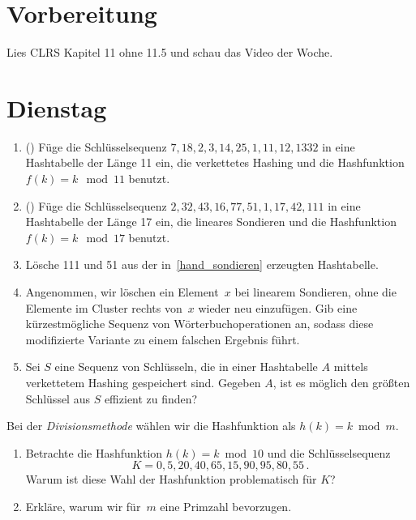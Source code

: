 \documentclass{uebung_cs}
\begin{document}
\section*{Vorbereitung}
Lies CLRS Kapitel 11 ohne 11.5 und schau das Video der Woche.

\section*{Dienstag}
\begin{aufgabe}\label{tue-first}\mbox{}
	\begin{enumerate}
		\item (\warmup) Füge die Schlüsselsequenz $7, 18, 2, 3, 14, 25, 1, 11, 12, 1332$ in eine Hashtabelle der Länge 11 ein, die verkettetes Hashing und die Hashfunktion $f(k) = k \mod 11$ benutzt.
		\item\label{hand_sondieren} (\warmup) Füge die Schlüsselsequenz $2, 32, 43, 16, 77, 51, 1, 17, 42, 111$ in eine Hashtabelle der Länge 17 ein, die lineares Sondieren und die Hashfunktion $f(k) = k \mod 17$ benutzt.
		\item Lösche 111 und 51 aus der in~\ref{hand_sondieren} erzeugten Hashtabelle.
		\item\label{wrong_delete} Angenommen, wir löschen ein Element~$x$ bei linearem Sondieren, ohne die Elemente im Cluster rechts von~$x$ wieder neu einzufügen.
		Gib eine kürzestmögliche Sequenz von Wörterbuchoperationen an, sodass diese modifizierte Variante zu einem falschen Ergebnis führt.
		\item Sei $S$ eine Sequenz von Schlüsseln, die in einer Hashtabelle $A$ mittels verkettetem Hashing gespeichert sind.
		Gegeben $A$, ist es möglich den größten Schlüssel aus $S$ effizient zu finden?
	\end{enumerate}
\end{aufgabe}

\begin{aufgabe}
	Bei der \emph{Divisionsmethode} wählen wir die Hashfunktion als $h(k)=k\bmod m$.
	\begin{enumerate}
		\item Betrachte die Hashfunktion $h(k) = k \bmod 10$ und die Schlüsselsequenz \[K = 0, 5, 20, 40, 65, 15, 90, 95, 80, 55\,.\] Warum ist diese Wahl der Hashfunktion problematisch für $K$?
		\item Erkläre, warum wir für~$m$ eine Primzahl bevorzugen.
	\end{enumerate}
\end{aufgabe}
\end{document}
